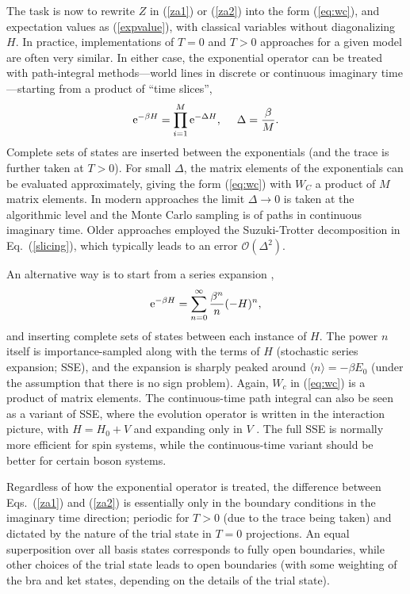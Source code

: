 \documentclass[range]{ar2e}
\begin{document}
The task is now to rewrite $Z$ in (\ref{za1}) or (\ref{za2}) into the form (\ref{eq:wc}), and expectation values as (\ref{expvalue}), with classical variables 
without diagonalizing $H$. In practice, implementations of $T=0$ and $T>0$ approaches for a given model are often very similar. In either case, the exponential 
operator can be treated with path-integral methods---world lines in discrete \cite{Suzuki77,Hirsch82} or continuous \cite{Beard96,Prokofev96,Prokofev98} 
imaginary time---starting from a product of ``time slices'',
\begin{equation}
{\rm e}^{-\beta H}= \prod_{i=1}^M {\rm e}^{-\Delta H},~~~~ \Delta=\frac{\beta}{M}.
\label{slicing}
\end{equation}
Complete sets of states are inserted between the exponentials (and the trace is further taken at $T>0$). For small $\Delta$, the
matrix elements of the exponentials can be evaluated approximately, giving the form (\ref{eq:wc}) with $W_C$ a product of $M$ matrix elements. 
In modern approaches the limit $\Delta \to 0$ is taken at the algorithmic level \cite{Prokofev96,WormA,Beard96} and the Monte Carlo sampling is of 
paths in continuous imaginary time. Older approaches employed the Suzuki-Trotter decomposition \cite{Suzuki76} in Eq.~(\ref{slicing}), which 
typically leads to an error $\mathcal{O}(\Delta^2)$.

An alternative way is to start from a series expansion \cite{Handscomb62,Sandvik91},
\begin{equation}
{\rm e}^{-\beta H}= \sum_{n=0}^\infty \frac{\beta^n}{n}(-H)^n,
\label{series}
\end{equation}
and inserting complete sets of states between each instance of $H$. The power $n$ itself is importance-sampled along with the terms of $H$ 
(stochastic series expansion; SSE), and the expansion is sharply peaked around $\langle n\rangle = -\beta E_0$ (under the assumption that there 
is no sign problem). Again, $W_c$ in (\ref{eq:wc}) is a product of matrix elements. The continuous-time path integral can also be seen as a variant 
of SSE, where the evolution operator is written in the interaction picture, with $H=H_0+V$ and expanding only in $V$ \cite{Prokofev96,Sandvik97a}. 
The full SSE is normally more efficient for spin systems, while the continuous-time variant should be better for certain boson systems.

Regardless of how the exponential operator is treated, the difference between Eqs.~(\ref{za1}) and (\ref{za2}) is essentially only in the boundary 
conditions in the imaginary time direction; periodic for $T>0$ (due to the trace being taken) and dictated by the nature of the trial state in $T=0$ 
projections. An equal superposition over all basis states corresponds to fully open boundaries, while other choices of the trial state leads to open 
boundaries (with some weighting of the bra and ket states, depending on the details of the trial state). 
\end{document}
